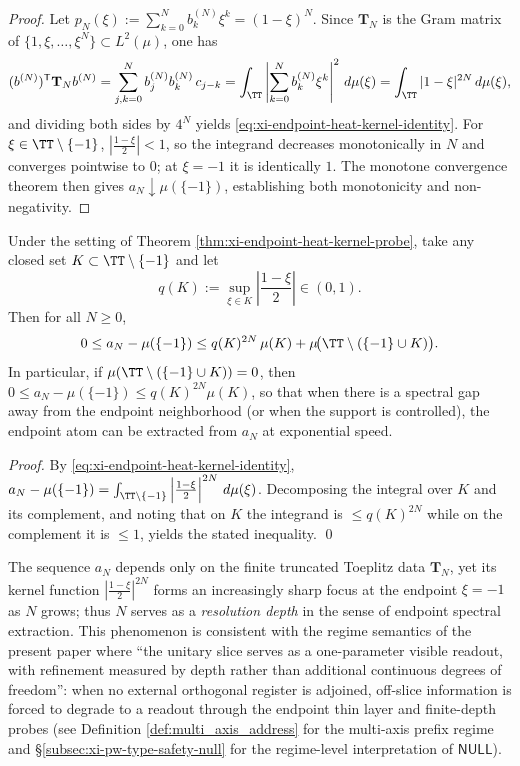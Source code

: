 \begin{proof}
Let \(p_N(\xi):=\sum_{k=0}^{N}b^{(N)}_k\xi^k=(1-\xi)^N\).
Since \(\mathbf{T}_N\) is the Gram matrix of \(\{1,\xi,\dots,\xi^N\}\subset L^2(\mu)\), one has
\[
(b^{(N)})^{\mathsf T}\mathbf{T}_N b^{(N)}
=\sum_{j,k=0}^{N}b^{(N)}_j b^{(N)}_k\,c_{j-k}
=\int_{\TT}\left|\sum_{k=0}^{N}b^{(N)}_k\xi^k\right|^{2}\,d\mu(\xi)
=\int_{\TT}|1-\xi|^{2N}\,d\mu(\xi),
\]
and dividing both sides by \(4^N\) yields \eqref{eq:xi-endpoint-heat-kernel-identity}.
For \(\xi\in\TT\setminus\{-1\}\), \(\left|\frac{1-\xi}{2}\right|<1\), so the integrand decreases monotonically in \(N\) and converges pointwise to \(0\); at \(\xi=-1\) it is identically \(1\).
The monotone convergence theorem then gives \(a_N\downarrow \mu(\{-1\})\), establishing both monotonicity and non-negativity.
\end{proof}

\begin{corollary}\label{cor:xi-endpoint-heat-kernel-exp-error}
Under the setting of Theorem \ref{thm:xi-endpoint-heat-kernel-probe}, take any closed set \(K\subset\TT\setminus\{-1\}\) and let
\[
q(K):=\sup_{\xi\in K}\left|\frac{1-\xi}{2}\right|\in(0,1).
\]
Then for all \(N\ge 0\),
\[
0\le a_N-\mu(\{-1\})
\le q(K)^{2N}\,\mu(K)+\mu\!\bigl(\TT\setminus(\{-1\}\cup K)\bigr).
\]
In particular, if \(\mu(\TT\setminus(\{-1\}\cup K))=0\), then
\(
0\le a_N-\mu(\{-1\})\le q(K)^{2N}\mu(K)
\), so that when there is a spectral gap away from the endpoint neighborhood (or when the support is controlled), the endpoint atom can be extracted from \(a_N\) at exponential speed.
\end{corollary}

\begin{proof}
By \eqref{eq:xi-endpoint-heat-kernel-identity},
\(
a_N-\mu(\{-1\})=\int_{\TT\setminus\{-1\}}\left|\frac{1-\xi}{2}\right|^{2N}\,d\mu(\xi)
\).
Decomposing the integral over \(K\) and its complement, and noting that on \(K\) the integrand is \(\le q(K)^{2N}\) while on the complement it is \(\le 1\), yields the stated inequality. \qed
\end{proof}

\begin{remark}\label{rem:xi-endpoint-probe-resolution-depth}
The sequence \(a_N\) depends only on the finite truncated Toeplitz data \(\mathbf{T}_N\), yet its kernel function \(\left|\frac{1-\xi}{2}\right|^{2N}\) forms an increasingly sharp focus at the endpoint \(\xi=-1\) as \(N\) grows; thus \(N\) serves as a \emph{resolution depth} in the sense of endpoint spectral extraction.
This phenomenon is consistent with the regime semantics of the present paper where ``the unitary slice serves as a one-parameter visible readout, with refinement measured by depth rather than additional continuous degrees of freedom'': when no external orthogonal register is adjoined, off-slice information is forced to degrade to a readout through the endpoint thin layer and finite-depth probes (see Definition \ref{def:multi_axis_address} for the multi-axis prefix regime and \S\ref{subsec:xi-pw-type-safety-null} for the regime-level interpretation of \(\mathsf{NULL}\)).
\end{remark}

